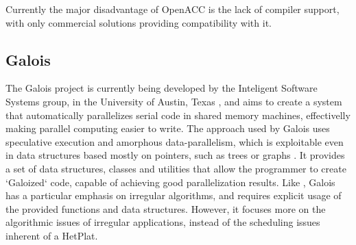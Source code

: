 \documentclass[main.tex]{subfiles}
\begin{document}
Currently the major disadvantage of \acs{OpenACC} is the lack of compiler support, with only commercial solutions providing compatibility with it.


\subsection{Galois}

The Galois project is currently being developed by the Inteligent Software Systems group, in the University of Austin, Texas , and aims to create a system that automatically parallelizes serial code in shared memory machines, effectivelly making parallel computing easier to write.
The approach used by Galois uses speculative execution and amorphous data-parallelism, which is exploitable even in data structures based mostly on pointers, such as trees or graphs \cite{pingaliamorphous,pingali2011tao}. It provides a set of data structures, classes and utilities that allow the programmer to create `Galoized` code, capable of achieving good parallelization results. Like \gama, Galois has a particular emphasis on irregular algorithms, and requires explicit usage of the provided functions and data structures. However, it focuses more on the algorithmic issues of irregular applications, instead of the scheduling issues inherent of a \acs{HetPlat}.
\end{document}
